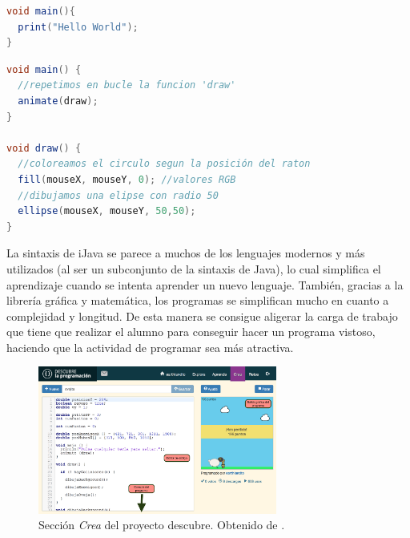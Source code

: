 {{\begin{lstlisting}[language={Java}, label={code:hello-world}, caption={Programa básico en iJava imprimiendo la cadena "Hello World".}]
void main(){
  print("Hello World");
}
\end{lstlisting}


\begin{lstlisting}[language={Java},label={code:circulos-color-raton}, caption={Programa en iJava que dibuja un circulo de un color diferente según la posición en la pantalla en la que se encuentra el ratón.}]
void main() {
  //repetimos en bucle la funcion 'draw'
  animate(draw);
}

void draw() {
  //coloreamos el circulo segun la posición del raton
  fill(mouseX, mouseY, 0); //valores RGB
  //dibujamos una elipse con radio 50
  ellipse(mouseX, mouseY, 50,50);
}
\end{lstlisting}


La sintaxis de iJava se parece a muchos de los lenguajes modernos y más utilizados (al ser un subconjunto de la sintaxis de Java), lo cual simplifica el aprendizaje cuando se intenta aprender un nuevo lenguaje. También, gracias a la librería gráfica y matemática, los programas se simplifican mucho en cuanto a complejidad y longitud. De esta manera se consigue aligerar la carga de trabajo que tiene que realizar el alumno para conseguir hacer un programa vistoso, haciendo que la actividad de programar sea más atractiva.


\begin{figure}[!ht]
	\begin{centering}
		\includegraphics[width=0.7\textwidth]{images/descubre-crea.png}
				\caption{Sección \emph{Crea} del proyecto \Gls{descubre}. Obtenido de \cite{descubre}.}
				\label{fig:descubre-crea}
	\end{centering}
\end{figure}


}}
